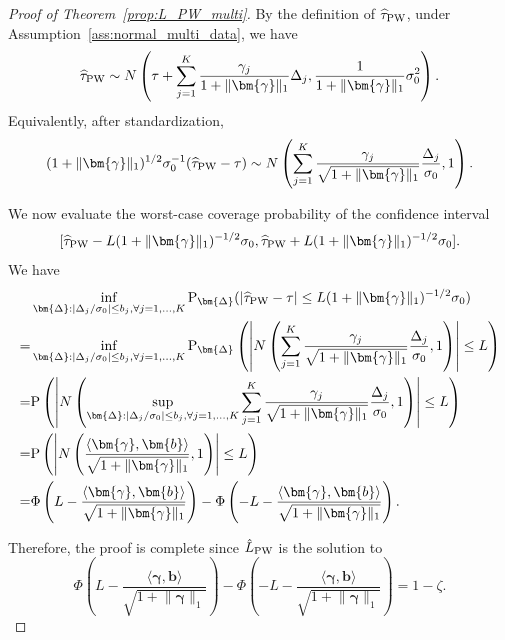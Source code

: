 \documentclass[11pt]{article}
\def\P{{\mathrm P}}
\newcommand{\htau}{\widehat\tau}
\numberwithin{equation}{section}
\theoremstyle{definition}
\begin{document}
\begin{proof}[Proof of Theorem~\ref{prop:L_PW_multi}]
By the definition of $\htau_{\rm PW}$, under Assumption~\ref{ass:normal_multi_data}, we have
\begin{align*}
  \htau_{\rm PW} \sim N\left(\tau +  \sum_{j=1}^K \frac{\gamma_j}{1+\lVert \bm{\gamma} \rVert_1} \Delta_j, \frac{1}{1+\lVert \bm{\gamma} \rVert_1} \sigma_0^2\right).
\end{align*}
Equivalently, after standardization,
\[
(1+\lVert \bm{\gamma}\rVert_1)^{1/2}\sigma_0^{-1}(\htau_{\rm PW}-\tau) \sim N\left(\sum_{j=1}^K \frac{\gamma_j}{\sqrt{1+\lVert \bm{\gamma}\rVert_1}}\frac{\Delta_j}{\sigma_0},1\right).
\]

We now evaluate the worst-case coverage probability of the confidence interval
\[
[\htau_{\rm PW} - L (1+\lVert \bm{\gamma} \rVert_1)^{-1/2} \sigma_0, \htau_{\rm PW} + L (1+\lVert \bm{\gamma} \rVert_1)^{-1/2} \sigma_0].
\]
We have
\begin{align*}
  & \inf_{\bm{\Delta}: \lvert \Delta_j/\sigma_0 \rvert \le b_j, \forall j=1,\ldots,K} \P_{\bm{\Delta}}(\lvert \htau_{\rm PW}- \tau \rvert \le L (1+\lVert \bm{\gamma} \rVert_1)^{-1/2} \sigma_0)\\
  =& \inf_{\bm{\Delta}: \lvert \Delta_j/\sigma_0 \rvert \le b_j, \forall j=1,\ldots,K} \P_{\bm{\Delta}}\left(\left\lvert N\left(\sum_{j=1}^K \frac{\gamma_j}{\sqrt{1+\lVert \bm{\gamma} \rVert_1}} \frac{\Delta_j}{\sigma_0}, 1\right) \right\rvert \le L \right)\\
  =& \P\left(\left\lvert N\left(\sup_{\bm{\Delta}: \lvert \Delta_j/\sigma_0 \rvert \le b_j, \forall j=1,\ldots,K} \sum_{j=1}^K \frac{\gamma_j}{\sqrt{1+\lVert \bm{\gamma} \rVert_1}} \frac{\Delta_j}{\sigma_0}, 1\right) \right\rvert \le L \right)\\
  =& \P\left(\left\lvert N\left(\frac{\langle \bm{\gamma}, \bm{b} \rangle}{\sqrt{1+\lVert \bm{\gamma} \rVert_1}}, 1\right) \right\rvert \le L \right)\\
  =& \Phi\left(L - \frac{\langle \bm{\gamma}, \bm{b} \rangle}{\sqrt{1+\lVert \bm{\gamma} \rVert_1}}  \right) - \Phi\left(-L - \frac{\langle \bm{\gamma}, \bm{b} \rangle}{\sqrt{1+\lVert \bm{\gamma} \rVert_1}} \right).
\end{align*}

Therefore, the proof is complete since $\hat{L}_{\rm PW}$ is the solution to
\[
  \Phi\left(L - \frac{\langle \bm{\gamma}, \bm{b} \rangle}{\sqrt{1+\lVert \bm{\gamma} \rVert_1}}  \right) - \Phi\left(-L - \frac{\langle \bm{\gamma}, \bm{b} \rangle}{\sqrt{1+\lVert \bm{\gamma} \rVert_1}} \right) = 1-\zeta.
\] 

\end{proof}
\end{document}

